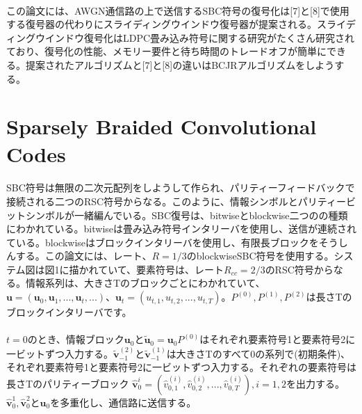 \documentclass[20 pts]{article}
\begin{document}
 \paragraph{}
 この論文には、AWGN通信路の上で送信するSBC符号の復号化は[7]と[8]で使用する復号器の代わりにスライディングウインドウ復号器が提案される。スライディングウインドウ復号化はLDPC畳み込み符号に関する研究がたくさん研究されており、復号化の性能、メモリー要件と待ち時間のトレードオフが簡単にできる。提案されたアルゴリズムと[7]と[8]の違いはBCJRアルゴリズムをしようする。
 \section{Sparsely Braided Convolutional Codes}
 \paragraph{}
 SBC符号は無限の二次元配列をしようして作られ、パリティーフィードバックで接続される二つのRSC符号からなる。このように、情報シンボルとパリティービットシンボルが一緒編んでいる。SBC復号は、bitwiseとblockwise二つのの種類にわかれている。bitwiseは畳み込み符号インタリーバを使用し、送信が連続されている。blockwiseはブロックインタリーバを使用し、有限長ブロックをそうしんする。この論文には、レート、$R=1/3$のblockwiseSBC符号を使用する。システム図は図1に描かれていて、要素符号は、レート$R_{cc}=2/3$のRSC符号からなる。情報系列は、大きさTのブロックごとにわかれていて、$\mathbf{u}=(\mathbf{u}_0,\mathbf{u}_1,...,\mathbf{u}_t,...)$、$\mathbf{u}_t=(u_{t,1},u_{t,2},...,u_{t,T})$。$P^{(0)},P^{(1)},P^{(2)}$は長さTのブロックインタリーバです。
 \paragraph{}
 $t=0$のとき、情報ブロック$\mathbf{u}_0$と$\widetilde{\mathbf{u}}_0=\mathbf{u}_0P^{(0)}$はそれぞれ要素符号1と要素符号2に一ビットずつ入力する。$\widetilde{\mathbf{v}}^{(2)}_{-1}
$と$\widetilde{\mathbf{v}}^{(1)}_{-1}$は大きさTのすべて0の系列で(初期条件)、それぞれ要素符号1と要素符号2に一ビットずつ入力する。それぞれの要素符号は長さTのパリティーブロック
$\hat{\mathbf{v}}^{i}_0=(\hat{v}^{(i)}_{0,1},\hat{v}^{(i)}_{0,2},...,\hat{v}^{(i)}_{0,T}),i=1,2$を出力する。$\hat{\mathbf{v}}^{1}_0,\hat{\mathbf{v}}^{2}_0$と$\mathbf{u}_0$を多重化し、通信路に送信する。
\end{document}
